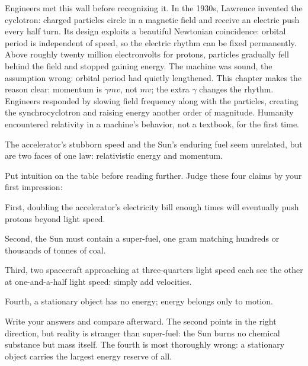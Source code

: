 \begin{mainline}
Engineers met this wall before recognizing it. In the 1930s, Lawrence invented the cyclotron: charged particles circle in a magnetic field and receive an electric push every half turn. Its design exploits a beautiful Newtonian coincidence: orbital period is independent of speed, so the electric rhythm can be fixed permanently. Above roughly twenty million electronvolts for protons, particles gradually fell behind the field and stopped gaining energy. The machine was sound, the assumption wrong: orbital period had quietly lengthened. This chapter makes the reason clear: momentum is \(\gamma mv\), not \(mv\); the extra \(\gamma\) changes the rhythm. Engineers responded by slowing field frequency along with the particles, creating the synchrocyclotron and raising energy another order of magnitude. Humanity encountered relativity in a machine's behavior, not a textbook, for the first time.

The accelerator's stubborn speed and the Sun's enduring fuel seem unrelated, but are two faces of one law: relativistic energy and momentum.
\end{mainline}


\begin{mainline}
Put intuition on the table before reading further. Judge these four claims by your first impression:

First, doubling the accelerator's electricity bill enough times will eventually push protons beyond light speed.

Second, the Sun must contain a super-fuel, one gram matching hundreds or thousands of tonnes of coal.

Third, two spacecraft approaching at three-quarters light speed each see the other at one-and-a-half light speed: simply add velocities.

Fourth, a stationary object has no energy; energy belongs only to motion.

Write your answers and compare afterward. The second points in the right direction, but reality is stranger than super-fuel: the Sun burns no chemical substance but mass itself. The fourth is most thoroughly wrong: a stationary object carries the largest energy reserve of all.
\end{mainline}


